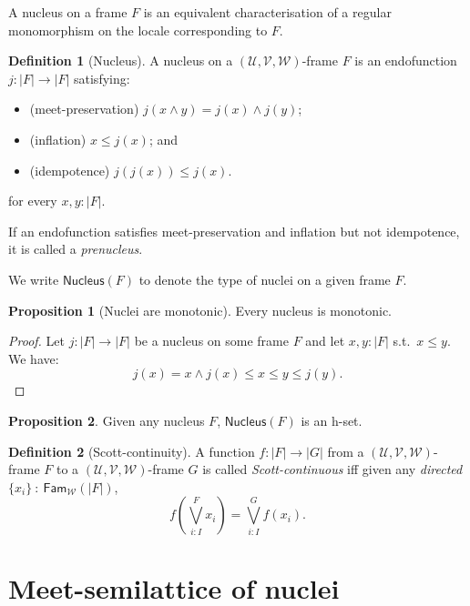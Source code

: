 \documentclass[a4paper, 11pt]{article}
\theoremstyle{definition}
\newtheorem{prop}{Proposition}
\newtheorem{defn}{Definition}
\newcommand{\UU}{\mathcal{U}}
\newcommand{\VV}{\mathcal{V}}
\newcommand{\WW}{\mathcal{W}}
\begin{document}
A nucleus on a frame $F$ is an equivalent characterisation of a regular monomorphism on the locale
corresponding to $F$.

\begin{defn}[Nucleus]
  A nucleus on a $(\UU, \VV, \WW)$-frame $F$ is an endofunction
  $j : | F | \rightarrow | F |$ satisfying:
  \begin{itemize}
    \item (meet-preservation) $j(x \wedge y) = j(x) \wedge j(y)$;
    \item (inflation) $x \le j(x)$; and
    \item (idempotence) $j(j(x)) \le j(x)$.
  \end{itemize}
  for every $x, y : | F |$.
\end{defn}

If an endofunction satisfies meet-preservation and inflation but not idempotence, it is called a
\emph{prenucleus}.

We write $\mathsf{Nucleus}(F)$ to denote the type of nuclei on a given frame $F$.

\begin{prop}[Nuclei are monotonic]\label{prop:nuclei-mono}
  Every nucleus is monotonic.
\end{prop}
\begin{proof}
  Let $j : | F | \rightarrow | F |$ be a nucleus on some frame $F$ and let $x, y : | F |$ s.t.\ $x \le y$.
  We have:
  \begin{equation*}
    j(x) = x \wedge j(x) \le x \le y \le j(y).
  \end{equation*}
\end{proof}

\begin{prop}
  Given any nucleus $F$, $\mathsf{Nucleus}(F)$ is an h-set.
\end{prop}

\begin{defn}[Scott-continuity]
  A function $f : | F | \rightarrow | G | $ from a $(\UU, \VV, \WW)$-frame $F$ to a $(\UU, \VV, \WW)$-frame
  $G$ is called \emph{Scott-continuous} iff given any \emph{directed}
  $\{ x_i \}~:~\mathsf{Fam}_{\WW}(| F |)$,
  \begin{equation*}
    f\left(\bigvee^F_{i : I} x_i\right) = \bigvee^G_{i : I} f(x_i).
  \end{equation*}
\end{defn}

\section{Meet-semilattice of nuclei}
\end{document}
